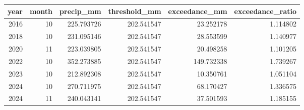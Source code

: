 \begin{tabular}{rrrrrr}
\toprule
year & month & precip\_mm & threshold\_mm & exceedance\_mm & exceedance\_ratio \\
\midrule
2016 & 10 & 225.793726 & 202.541547 & 23.252178 & 1.114802 \\
2018 & 10 & 231.095146 & 202.541547 & 28.553599 & 1.140977 \\
2020 & 11 & 223.039805 & 202.541547 & 20.498258 & 1.101205 \\
2022 & 10 & 352.273885 & 202.541547 & 149.732338 & 1.739267 \\
2023 & 10 & 212.892308 & 202.541547 & 10.350761 & 1.051104 \\
2024 & 10 & 270.711975 & 202.541547 & 68.170427 & 1.336575 \\
2024 & 11 & 240.043141 & 202.541547 & 37.501593 & 1.185155 \\
\bottomrule
\end{tabular}
